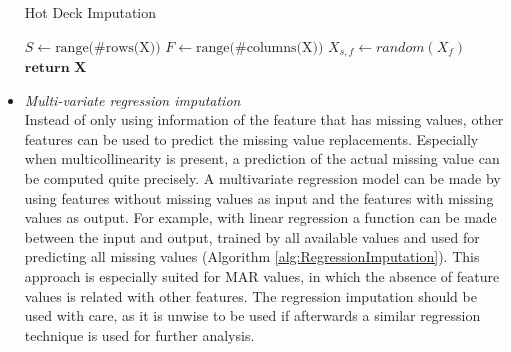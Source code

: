 \documentclass[10pt,a4paper]{article}
\begin{document}
\begin{itemize}
		\begin{algorithm}[H]
			\caption{Hot Deck Imputation}\label{alg:HotDeckImputation}
			\begin{algorithmic}[1]
				\State $S \gets \text{range(\#rows(X))}$ 	
				\State $F \gets \text{range(\#columns(X))}$ 	
				 					
				 				 			
				\State $X_{s,f} \gets \textit{random}(X_f)$	
				\EndIf
				\EndFor
				\State $\textbf{return X}$
				\EndProcedure
			\end{algorithmic}
		\end{algorithm}	
		
		\item \textit{Multi-variate regression imputation} \\
		Instead of only using information of the feature that has missing values, other features can be used to predict the missing value replacements. Especially when multicollinearity is present, a prediction of the actual missing value can be computed quite precisely. A multivariate regression model can be made by using features without missing values as input and the features with missing values as output. For example, with linear regression a function can be made between the input and output, trained by all available values and used for predicting all missing values (Algorithm \ref{alg:RegressionImputation})\cite{raghunathan2001multivariate}. This approach is especially suited for MAR values, in which the absence of feature values is related with other features. The regression imputation should be used with care, as it is unwise to be used if afterwards a similar regression technique is used for further analysis\cite{donders2006gentle}.
		

\end{itemize}
\end{document}
